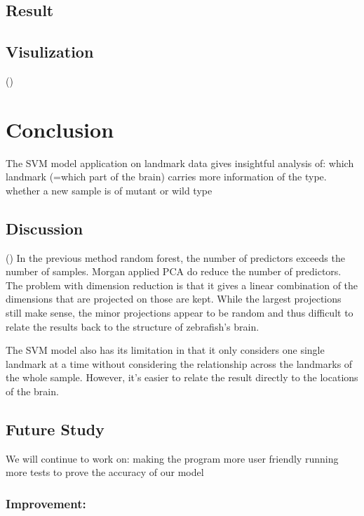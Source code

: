 \documentclass[10pt,letterpaper]{article}
\begin{document}
\subsection{Result}\label{result}

\subsection{Visulization}\label{visulization}

()

\section{Conclusion}\label{conclusion}

The SVM model application on landmark data gives insightful analysis of:
which landmark (=which part of the brain) carries more information of
the type. whether a new sample is of mutant or wild type

\subsection{Discussion}\label{discussion}

() In the previous method random forest, the number of predictors
exceeds the number of samples. Morgan applied PCA do reduce the number
of predictors. The problem with dimension reduction is that it gives a
linear combination of the dimensions that are projected on those are
kept. While the largest projections still make sense, the minor
projections appear to be random and thus difficult to relate the results
back to the structure of zebrafish's brain.

The SVM model also has its limitation in that it only considers one
single landmark at a time without considering the relationship across
the landmarks of the whole sample. However, it's easier to relate the
result directly to the locations of the brain.

\subsection{Future Study}\label{future-study}

We will continue to work on: making the program more user friendly
running more tests to prove the accuracy of our model

\subsubsection{Improvement:}\label{improvement}
\end{document}
